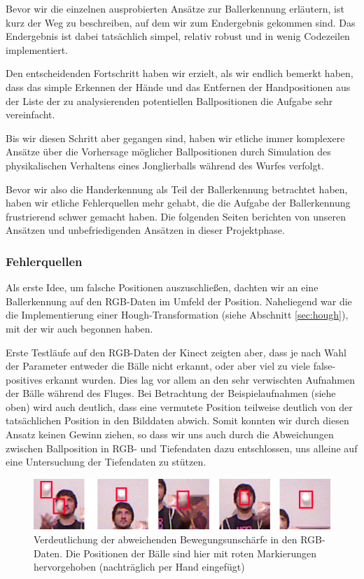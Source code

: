 \documentclass[12pt,a4paper,ngerman]{scrartcl}
\begin{document}
Bevor wir die einzelnen ausprobierten Ansätze zur Ballerkennung erläutern, ist kurz
der Weg zu beschreiben, auf dem wir zum Endergebnis gekommen sind. Das Endergebnis
ist dabei tatsächlich simpel, relativ robust und in
wenig Codezeilen implementiert.

Den entscheidenden Fortschritt haben wir erzielt, als wir endlich bemerkt haben,
dass das simple Erkennen der Hände und das Entfernen der Handpositionen aus der
Liste der zu analysierenden potentiellen Ballpositionen die Aufgabe sehr
vereinfacht.

Bis wir diesen Schritt aber gegangen sind, haben wir etliche immer komplexere
Ansätze über die Vorhersage möglicher Ballpositionen durch Simulation des
physikalischen Verhaltens eines Jonglierballs während des Wurfes verfolgt.

Bevor wir also die Handerkennung als Teil der Ballerkennung betrachtet haben,
haben wir etliche Fehlerquellen mehr gehabt, die die Aufgabe der Ballerkennung
frustrierend schwer gemacht haben. Die folgenden Seiten berichten von unseren
Ansätzen und unbefriedigenden Ansätzen in dieser Projektphase.

\subsubsection{Fehlerquellen}

Als erste Idee, um falsche Positionen auszuschließen, dachten wir an eine
Ballerkennung auf den RGB-Daten im Umfeld der Position. Naheliegend war die die
Implementierung einer Hough-Transformation (siehe Abschnitt \ref{sec:hough}), mit der wir auch begonnen haben.

Erste Testläufe auf den RGB-Daten der Kinect zeigten aber, dass je nach Wahl der
Parameter entweder die Bälle nicht erkannt, oder aber viel zu viele false-positives
erkannt wurden. Dies lag vor allem an den sehr verwischten Aufnahmen der Bälle
während des Fluges. Bei Betrachtung der Beispielaufnahmen (siehe oben) wird auch
deutlich, dass eine vermutete Position teilweise deutlich von der tatsächlichen
Position in den Bilddaten abwich. Somit konnten wir durch diesen Ansatz keinen Gewinn
ziehen, so dass wir uns auch durch die Abweichungen zwischen Ballposition in RGB- und
Tiefendaten dazu entschlossen, uns alleine auf eine Untersuchung der Tiefendaten zu
stützen.


\begin{figure}[H]
  \centering
      \includegraphics[scale=0.8]{img/rgb-blur.png}
  \caption{Verdeutlichung der abweichenden Bewegungsunschärfe in den RGB-Daten. Die Positionen der Bälle sind hier mit roten Markierungen hervorgehoben (nachträglich per Hand eingefügt)}
  \label{bewegungsunschaerfe}
\end{figure}
\end{document}
